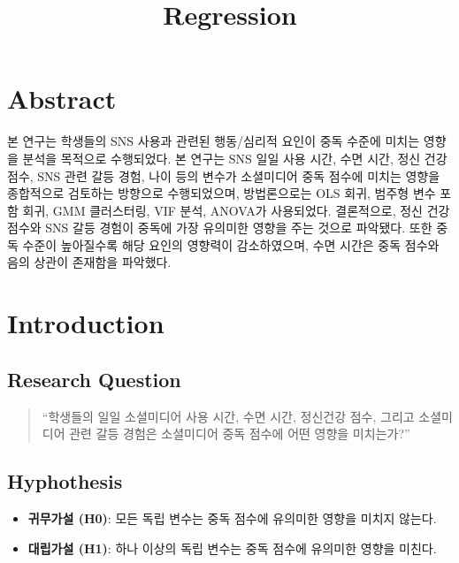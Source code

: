 \documentclass[11pt]{article}
\title{Regression}
\providecommand{\tightlist}{%
      \setlength{\itemsep}{0pt}\setlength{\parskip}{0pt}}
\begin{document}
    
    \maketitle
    
    

    
    \section{Abstract}\label{abstract}

본 연구는 학생들의 SNS 사용과 관련된 행동/심리적 요인이 중독 수준에
미치는 영향을 분석을 목적으로 수행되었다. 본 연구는 SNS 일일 사용 시간,
수면 시간, 정신 건강 점수, SNS 관련 갈등 경험, 나이 등의 변수가
소셜미디어 중독 점수에 미치는 영향을 종합적으로 검토하는 방향으로
수행되었으며, 방법론으로는 OLS 회귀, 범주형 변수 포함 회귀, GMM
클러스터링, VIF 분석, ANOVA가 사용되었다. 결론적으로, 정신 건강 점수와
SNS 갈등 경험이 중독에 가장 유의미한 영향을 주는 것으로 파악됐다. 또한
중독 수준이 높아질수록 해당 요인의 영향력이 감소하였으며, 수면 시간은
중독 점수와 음의 상관이 존재함을 파악했다.

    \section{Introduction}\label{introduction}

\subsection{Research Question}\label{research-question}

\begin{quote}
``학생들의 일일 소셜미디어 사용 시간, 수면 시간, 정신건강 점수, 그리고
소셜미디어 관련 갈등 경험은 소셜미디어 중독 점수에 어떤 영향을
미치는가?''
\end{quote}

\subsection{Hyphothesis}\label{hyphothesis}

\begin{itemize}
\tightlist
\item
  \textbf{귀무가설 (H0)}: 모든 독립 변수는 중독 점수에 유의미한 영향을
  미치지 않는다.
\item
  \textbf{대립가설 (H1)}: 하나 이상의 독립 변수는 중독 점수에 유의미한
  영향을 미친다.
\end{itemize}
\end{document}
